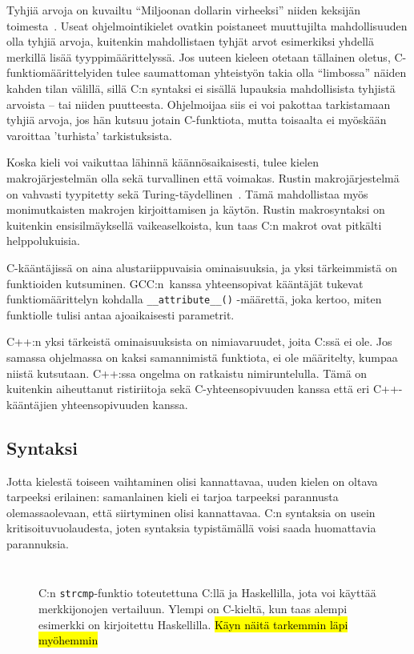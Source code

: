 Tyhjiä arvoja on kuvailtu ``Miljoonan dollarin virheeksi'' niiden keksijän
toimesta~\citep{billiondollars}. Useat ohjelmointikielet ovatkin poistaneet
muuttujilta mahdollisuuden olla tyhjiä arvoja, kuitenkin mahdollistaen tyhjät
arvot esimerkiksi yhdellä merkillä lisää tyyppimäärittelyssä. Jos uuteen
kieleen otetaan tällainen oletus, C-funktiomäärittelyiden tulee saumattoman
yhteistyön takia olla ``limbossa'' näiden kahden tilan välillä, sillä C:n
syntaksi ei sisällä lupauksia mahdollisista tyhjistä arvoista -- tai niiden
puutteesta. Ohjelmoijaa siis ei voi pakottaa tarkistamaan tyhjiä arvoja, jos
hän kutsuu jotain C-funktiota, mutta toisaalta ei myöskään varoittaa 'turhista'
tarkistuksista.

Koska kieli voi vaikuttaa lähinnä käännösaikaisesti, tulee kielen
makrojärjestelmän olla sekä turvallinen että voimakas. Rustin makrojärjestelmä
on vahvasti tyypitetty sekä Turing-täydellinen~\citep{rustmacros}. Tämä
mahdollistaa myös monimutkaisten makrojen kirjoittamisen ja käytön. Rustin
makrosyntaksi on kuitenkin ensisilmäyksellä vaikeaselkoista, kun taas C:n
makrot ovat pitkälti helppolukuisia.

C-kääntäjissä on aina alustariippuvaisia ominaisuuksia, ja yksi tärkeimmistä on
funktioiden kutsuminen. GCC:n~\citationneeded kanssa yhteensopivat kääntäjät
tukevat funktiomäärittelyn kohdalla \texttt{\_\_attribute\_\_()} -määrettä,
joka kertoo, miten funktiolle tulisi antaa ajoaikaisesti parametrit.

C++:n yksi tärkeistä ominaisuuksista on nimiavaruudet, joita C:ssä ei ole. Jos
samassa ohjelmassa on kaksi samannimistä funktiota, ei ole määritelty, kumpaa
niistä kutsutaan. C++:ssa ongelma on ratkaistu nimiruntelulla. Tämä on
kuitenkin aiheuttanut ristiriitoja sekä C-yhteensopivuuden kanssa että eri
C++-kääntäjien yhteensopivuuden kanssa.

\subsection{Syntaksi}

Jotta kielestä toiseen vaihtaminen olisi kannattavaa, uuden kielen on oltava
tarpeeksi erilainen: samanlainen kieli ei tarjoa tarpeeksi parannusta
olemassaolevaan, että siirtyminen olisi kannattavaa. C:n syntaksia on usein
kritisoitu\citationneeded vuolaudesta, joten syntaksia typistämällä voisi saada
huomattavia parannuksia.

\begin{figure}[ht!]
    \inputminted{C}{strcmp.c}
    \inputminted{Haskell}{strcmp.hs}
    \caption{C:n \texttt{strcmp}-funktio toteutettuna C:llä ja Haskellilla,
    jota voi käyttää merkkijonojen vertailuun. Ylempi on C-kieltä, kun taas
    alempi esimerkki on kirjoitettu Haskellilla.
    \hl{Käyn näitä tarkemmin läpi myöhemmin}
    \label{fig:strcmp}
}
\end{figure}

